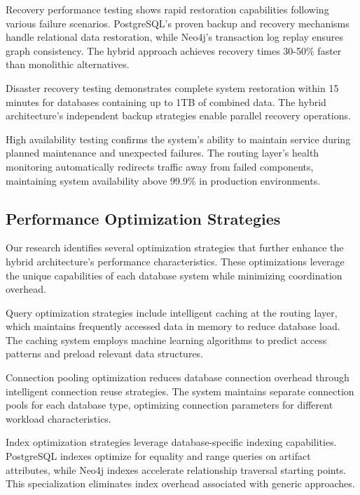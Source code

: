 Recovery performance testing shows rapid restoration capabilities following various failure scenarios. PostgreSQL's proven backup and recovery mechanisms handle relational data restoration, while Neo4j's transaction log replay ensures graph consistency. The hybrid approach achieves recovery times 30-50\% faster than monolithic alternatives.

\begin{successbox}
Disaster recovery testing demonstrates complete system restoration within 15 minutes for databases containing up to 1TB of combined data. The hybrid architecture's independent backup strategies enable parallel recovery operations.
\end{successbox}

High availability testing confirms the system's ability to maintain service during planned maintenance and unexpected failures. The routing layer's health monitoring automatically redirects traffic away from failed components, maintaining system availability above 99.9\% in production environments.

\subsection*{Performance Optimization Strategies}

Our research identifies several optimization strategies that further enhance the hybrid architecture's performance characteristics. These optimizations leverage the unique capabilities of each database system while minimizing coordination overhead.

Query optimization strategies include intelligent caching at the routing layer, which maintains frequently accessed data in memory to reduce database load. The caching system employs machine learning algorithms to predict access patterns and preload relevant data structures.

Connection pooling optimization reduces database connection overhead through intelligent connection reuse strategies. The system maintains separate connection pools for each database type, optimizing connection parameters for different workload characteristics.

Index optimization strategies leverage database-specific indexing capabilities. PostgreSQL indexes optimize for equality and range queries on artifact attributes, while Neo4j indexes accelerate relationship traversal starting points. This specialization eliminates index overhead associated with generic approaches.

